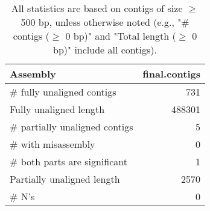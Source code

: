 \documentclass[12pt,a4paper]{article}
\begin{document}
\begin{table}[ht]
\begin{center}
\caption{All statistics are based on contigs of size $\geq$ 500 bp, unless otherwise noted (e.g., "\# contigs ($\geq$ 0 bp)" and "Total length ($\geq$ 0 bp)" include all contigs).}
\begin{tabular}{|l*{1}{|r}|}
\hline
Assembly & final.contigs \\ \hline
\# fully unaligned contigs & 731 \\ \hline
Fully unaligned length & 488301 \\ \hline
\# partially unaligned contigs & 5 \\ \hline
\hspace{5mm}\# with misassembly & 0 \\ \hline
\hspace{5mm}\# both parts are significant & 1 \\ \hline
Partially unaligned length & 2570 \\ \hline
\# N's & 0 \\ \hline
\end{tabular}
\end{center}
\end{table}
\end{document}
